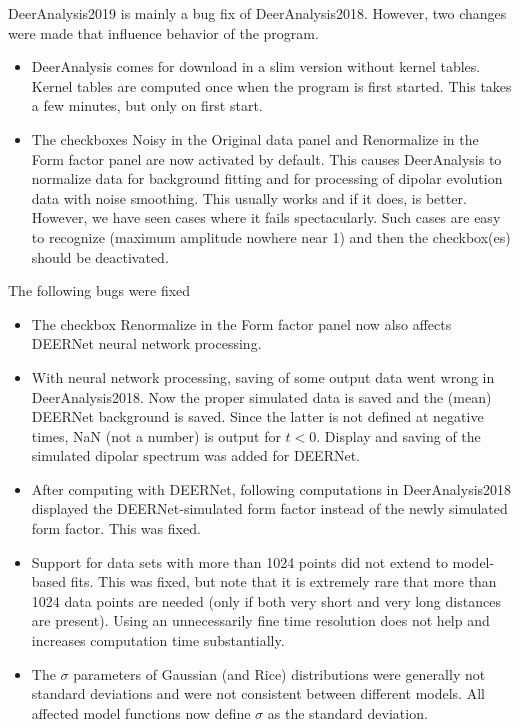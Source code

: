 \documentclass{article}
\begin{document}
DeerAnalysis2019 is mainly a bug fix of DeerAnalysis2018. However, two changes were made that influence behavior of the program.

\begin{itemize}
\item
DeerAnalysis comes for download in a slim version without kernel tables. Kernel tables are computed once when the program is first started. This takes a few minutes, but only on first start.
\item
The checkboxes {\ttfamily Noisy} in the {\ttfamily Original data} panel and {\ttfamily Renormalize} in the {\ttfamily Form factor} panel are now activated by default. This causes DeerAnalysis to normalize data for background fitting and for processing of dipolar evolution data with noise smoothing. This usually works and if it does, is better. However, we have seen cases where it fails spectacularly. Such cases are easy to recognize (maximum amplitude nowhere near 1) and then the checkbox(es) should be deactivated.
\end{itemize}

The following bugs were fixed

\begin{itemize}
\item
The checkbox {\ttfamily Renormalize} in the {\ttfamily Form factor} panel now also affects DEERNet neural network processing.
\item
With neural network processing, saving of some output data went wrong in DeerAnalysis2018. Now the proper simulated data is saved and the (mean) DEERNet background is saved. Since the latter is not defined at negative times, NaN (not a number) is output for $t < 0$. Display and saving of the simulated dipolar spectrum was added for DEERNet.
\item
After computing with DEERNet, following computations in DeerAnalysis2018 displayed the DEERNet-simulated form factor instead of the newly simulated form factor. This was fixed.
\item
Support for data sets with more than 1024 points did not extend to model-based fits. This was fixed, but note that it is extremely rare that more than 1024 data points are needed (only if both very short and very long distances are present). Using an unnecessarily fine time resolution does not help and increases computation time substantially. 
\item
The $\sigma$ parameters of Gaussian (and Rice) distributions were generally not standard deviations and were not consistent between different models. All affected model functions now define $\sigma$ as the standard deviation.
\end{itemize}
\end{document}
